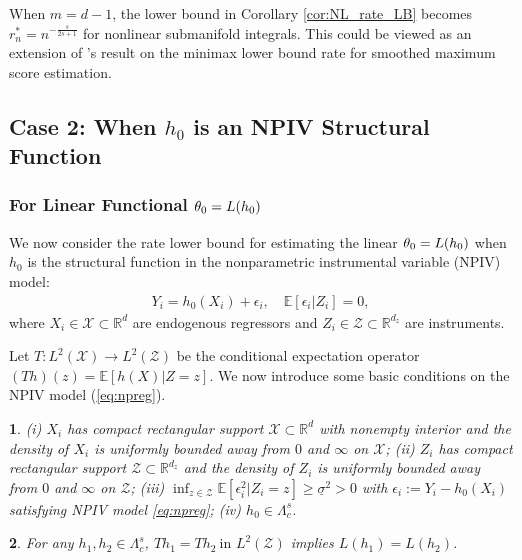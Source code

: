 \documentclass[12pt,american]{article}
\theoremstyle{definition}
\theoremstyle{plain}
\newtheorem{assumption}{\protect\assumptionname}
\theoremstyle{definition}
\theoremstyle{plain}
\theoremstyle{plain}
\theoremstyle{plain}
\theoremstyle{plain}
\theoremstyle{plain}
\newcommand{\R}{\mathbb{R}}
\newcommand{\E}{\mathbb{E}}
\providecommand{\assumptionname}{Assumption}
\providecommand{\assumptionname}{Assumption}
\begin{document}
When $m=d-1$, the lower bound in Corollary \ref{cor:NL_rate_LB} becomes $r^*_{n}=n^{-\frac{s}{2s+1}}$ for nonlinear submanifold integrals. This could be viewed as an extension of \citet{horowitz1993et}'s result on the minimax lower bound rate for smoothed maximum score estimation.

\subsection{Case 2: When $h_0$ is an NPIV Structural Function} \label{subsec:Minimax_NPIV-LB}

\subsubsection{For Linear Functional $\theta_0=L(h_0)$}

We now consider the rate lower bound for estimating the linear $\theta_0=L(h_0)$ when
$h_0$ is the structural function in the nonparametric instrumental variable (NPIV) model:
\begin{align}
  Y_i = h_0(X_i) + \epsilon_i, \quad \E[\epsilon_i | Z_i] = 0,\label{eq:npreg}
\end{align}
where $X_i \in \mathcal{X} \subset \R^d$ are endogenous regressors and $Z_i \in \mathcal{Z} \subset \R^{d_z}$ are instruments.

Let $T: L^2(\mathcal{X}) \rightarrow L^2(\mathcal{Z})$ be the conditional expectation operator $(Th)(z)=\E[h(X)|Z=z]$. We now introduce some basic conditions on the NPIV model (\ref{eq:npreg}).

\begin{assumption} \label{a-NPIV-data}
  (i) $X_i$ has compact rectangular support $\mathcal{X} \subset \R^d$ with nonempty interior and the density of $X_i$ is uniformly bounded away from $0$ and $\infty$ on $\mathcal{X}$; (ii) $Z_i$ has compact rectangular support $\mathcal{Z} \subset \R^{d_z}$ and the density of $Z_i$ is uniformly bounded away from $0$ and $\infty$ on $\mathcal{Z}$; (iii) $\inf_{z\in \mathcal{Z}} \E[\epsilon_i^2|Z_i = z] \geq \underline \sigma^2 > 0$ with $\epsilon_i:= Y_i - h_0(X_i)$ satisfying NPIV model \eqref{eq:npreg}; (iv) $h_0 \in \Lambda^s_c$.
\end{assumption}

\begin{assumption} \label{a-NPIV-ID}
  For any $h_1,h_2\in \Lambda_c^s$, $Th_1 = Th_2 \ \text{in } L^2(\mathcal{Z})$ implies $L(h_1)=L(h_2)$.
\end{assumption}
\end{document}

